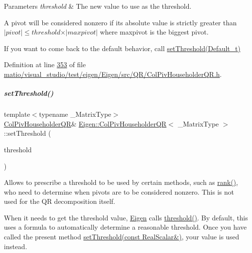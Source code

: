 \begin{DoxyParams}{Parameters}
{\em threshold} & The new value to use as the threshold.\\
\hline
\end{DoxyParams}
A pivot will be considered nonzero if its absolute value is strictly greater than $ \vert pivot \vert \leqslant threshold \times \vert maxpivot \vert $ where maxpivot is the biggest pivot.

If you want to come back to the default behavior, call \hyperlink{group___q_r___module_a648df14c457ceceb09d933d06d3bdded}{set\+Threshold(\+Default\+\_\+t)} 

Definition at line \hyperlink{matio_2visual__studio_2test_2eigen_2_eigen_2src_2_q_r_2_col_piv_householder_q_r_8h_source_l00353}{353} of file \hyperlink{matio_2visual__studio_2test_2eigen_2_eigen_2src_2_q_r_2_col_piv_householder_q_r_8h_source}{matio/visual\+\_\+studio/test/eigen/\+Eigen/src/\+Q\+R/\+Col\+Piv\+Householder\+Q\+R.\+h}.

\mbox{\label{group___q_r___module_ae712cdc9f0e521cfc8061bee58ff55ee}} 
\subparagraph{\texorpdfstring{set\+Threshold()}{setThreshold()}\hspace{0.1cm}{\footnotesize\ttfamily [2/4]}}
{\footnotesize\ttfamily template$<$typename \+\_\+\+Matrix\+Type$>$ \\
\hyperlink{group___q_r___module_class_eigen_1_1_col_piv_householder_q_r}{Col\+Piv\+Householder\+QR}\& \hyperlink{group___q_r___module_class_eigen_1_1_col_piv_householder_q_r}{Eigen\+::\+Col\+Piv\+Householder\+QR}$<$ \+\_\+\+Matrix\+Type $>$\+::set\+Threshold (\begin{DoxyParamCaption}\item[{const Real\+Scalar \&}]{threshold }\end{DoxyParamCaption})\hspace{0.3cm}{\ttfamily [inline]}}

Allows to prescribe a threshold to be used by certain methods, such as \hyperlink{group___q_r___module_a2a59aaa689613ce5ef0c9130ad33940e}{rank()}, who need to determine when pivots are to be considered nonzero. This is not used for the QR decomposition itself.

When it needs to get the threshold value, \hyperlink{namespace_eigen}{Eigen} calls \hyperlink{group___q_r___module_a72276adb1aa11f870f50d0bd58af014d}{threshold()}. By default, this uses a formula to automatically determine a reasonable threshold. Once you have called the present method \hyperlink{group___q_r___module_ae712cdc9f0e521cfc8061bee58ff55ee}{set\+Threshold(const Real\+Scalar\&)}, your value is used instead.


